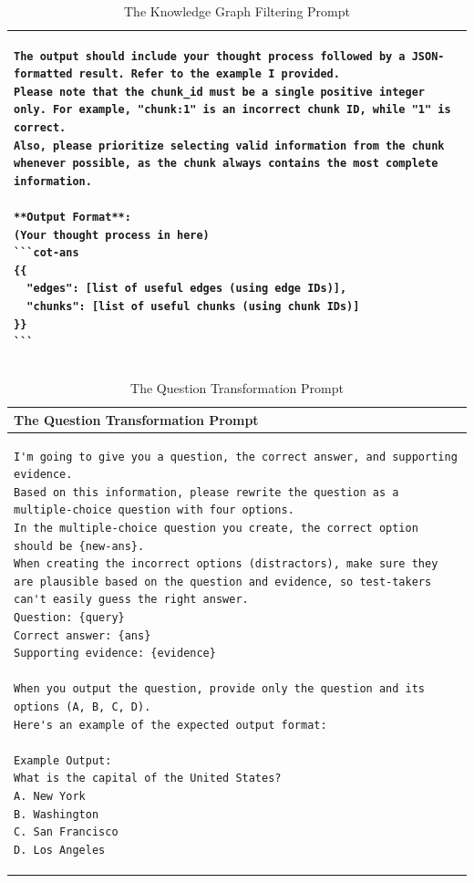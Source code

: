 \begin{table}[h]
\begin{tabular}{p{\textwidth}}
\begin{lstlisting}[basicstyle=\ttfamily\small, frame=single, breaklines=true, breakindent=0pt]
The output should include your thought process followed by a JSON-formatted result. Refer to the example I provided.  
Please note that the chunk_id must be a single positive integer only. For example, "chunk:1" is an incorrect chunk ID, while "1" is correct.
Also, please prioritize selecting valid information from the chunk whenever possible, as the chunk always contains the most complete information.

**Output Format**:  
(Your thought process in here)  
```cot-ans  
{{
  "edges": [list of useful edges (using edge IDs)],  
  "chunks": [list of useful chunks (using chunk IDs)]  
}}
```
\end{lstlisting} \\
\bottomrule
\end{tabular}
\caption{The Knowledge Graph Filtering Prompt}
\label{tab:kg-filtering-prompt}
\end{table}


\begin{table}[h]
\centering
\begin{tabular}{p{\textwidth}}
\toprule
\textbf{The Question Transformation Prompt} \\ 
\midrule
\begin{lstlisting}[basicstyle=\ttfamily\small, frame=single, breaklines=true, breakindent=0pt]
I'm going to give you a question, the correct answer, and supporting evidence. 
Based on this information, please rewrite the question as a multiple-choice question with four options. 
In the multiple-choice question you create, the correct option should be {new-ans}.  
When creating the incorrect options (distractors), make sure they are plausible based on the question and evidence, so test-takers can't easily guess the right answer. 
Question: {query}  
Correct answer: {ans}  
Supporting evidence: {evidence} 

When you output the question, provide only the question and its options (A, B, C, D). 
Here's an example of the expected output format:

Example Output:
What is the capital of the United States?
A. New York
B. Washington
C. San Francisco
D. Los Angeles
\end{lstlisting} \\
\bottomrule
\end{tabular}
\caption{The Question Transformation Prompt}
\label{tab:question-transformation-prompt}
\end{table}


